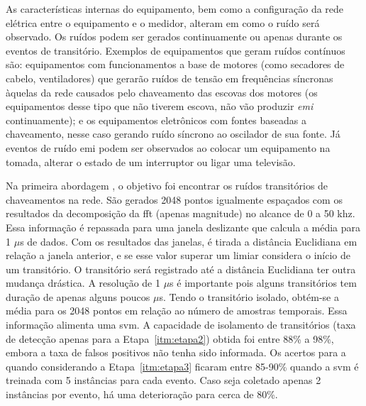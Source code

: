 \begin{enumerate}[label=\textbf{2.\arabic*},wide=\parindent]
\begin{itemize}[wide=\parindent]
As características internas do equipamento, bem como a configuração da
rede elétrica entre o equipamento e o medidor, alteram em como o ruído
será observado. Os ruídos podem ser gerados continuamente ou apenas
durante os eventos de transitório. Exemplos de equipamentos que geram
ruídos contínuos são: equipamentos com funcionamentos a base de motores
(como secadores de cabelo, ventiladores) que gerarão ruídos de
tensão em frequências síncronas àquelas da rede causados pelo
chaveamento das escovas dos motores (os equipamentos desse tipo que não
tiverem escova, não vão produzir \emph{emi} continuamente); e os
equipamentos eletrônicos com fontes baseadas a chaveamento, nesse caso
gerando ruído síncrono ao oscilador de sua fonte. Já eventos de ruído
\gls{emi} podem ser observados ao colocar um equipamento na tomada,
alterar o estado de um interruptor ou ligar uma televisão.

Na primeira abordagem \cite{nilm_patel_2007_29}, o objetivo foi
encontrar os ruídos transitórios de chaveamentos na rede. São gerados
2048 pontos igualmente espaçados com os resultados da decomposição da
\gls{fft} (apenas magnitude) no alcance de 0 a 50 k\acs{hz}. Essa
informação é repassada para uma janela deslizante que calcula a média
para 1 $\mu$s de dados. Com os resultados das janelas, é tirada a
distância Euclidiana em relação a janela anterior, e se esse valor
superar um limiar considera o início de um transitório. O transitório
será registrado até a distância Euclidiana ter outra mudança drástica.
A resolução de 1 $\mu$s é importante pois alguns transitórios tem
duração de apenas alguns poucos $\mu$s. Tendo o transitório isolado,
obtém-se a média para os 2048 pontos em relação ao número de amostras
temporais. Essa informação alimenta uma \acs{svm}. A capacidade
de isolamento de transitórios (taxa de detecção apenas para a
Etapa~\ref{itm:etapa2}) obtida foi entre 88\% a 98\%, embora a taxa de
falsos positivos não tenha sido informada. Os acertos para a
quando considerando a Etapa~\ref{itm:etapa3} ficaram entre 85-90\%
quando a \acs{svm} é treinada com 5 instâncias para cada evento.
Caso seja coletado apenas 2 instâncias por evento, há uma deterioração
para cerca de 80\%.


\end{itemize}
\end{enumerate}
